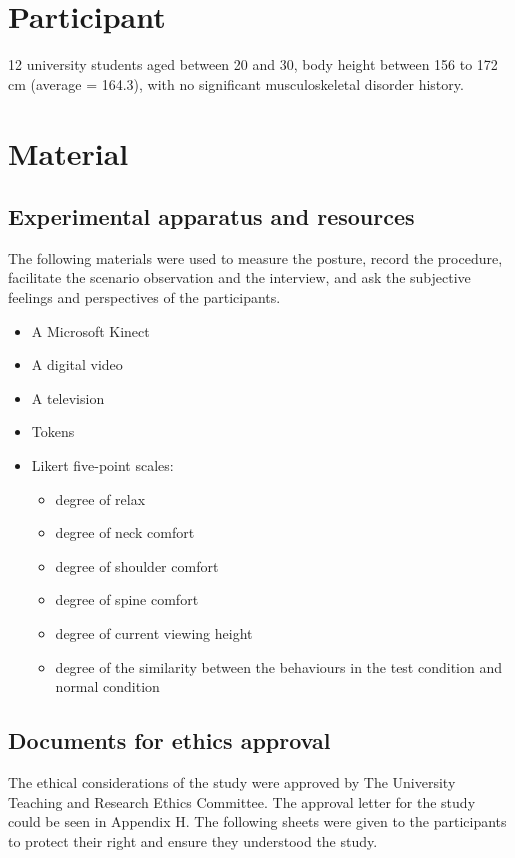 \section{Participant}
12 university students aged between 20 and 30, body height between 156 to 172 cm (average = 164.3), with no significant musculoskeletal disorder history.

\section{Material}

\subsection{Experimental apparatus and resources}
The following materials were used to measure the posture, record the procedure, facilitate the scenario observation and the interview, and ask the subjective feelings and perspectives of the participants.

\begin{itemize}
 \item A Microsoft Kinect
 \item A digital video
 \item A television
 \item Tokens
 \item Likert five-point scales:
  \begin{itemize}
   \item degree of relax
   \item degree of neck comfort
   \item degree of shoulder comfort
   \item degree of spine comfort
   \item degree of current viewing height
   \item degree of the similarity between the behaviours in the test condition and normal condition
  \end{itemize}
\end{itemize}

\subsection{Documents for ethics approval}

The ethical considerations of the study were approved by The University Teaching and Research Ethics Committee. The approval letter for the study could be seen in Appendix H. The following sheets were given to the participants to protect their right and ensure they understood the study.

